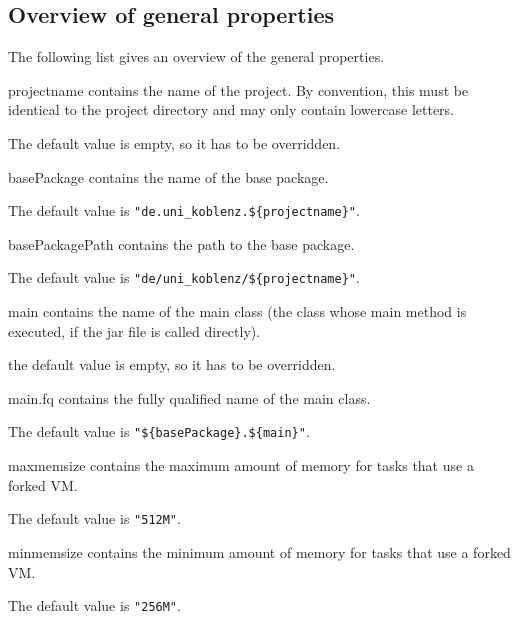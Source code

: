 \documentclass[a4paper,twoside,11pt,bibtotoc]{article}
\begin{document}
\subsection{Overview of general properties}
The following list gives an overview of the general properties.
\begin{description*}
	\item[projectname] contains the name of the project. By convention, this must be identical to the project directory and may only contain lowercase letters.\par The default value is empty, so it has to be overridden.
	\item[basePackage] contains the name of the base package.\par The default value is \texttt{"de.uni\_koblenz.\$\{projectname\}"}.
	\item[basePackagePath] contains the path to the base package.\par The default value is \texttt{"de/uni\_koblenz/\$\{projectname\}"}.
	\item[main] contains the name of the main class (the class whose main method is executed, if the jar file is called directly).\par the default value is empty, so it has to be overridden.
	\item[main.fq] contains the fully qualified name of the main class.\par The default value is \texttt{"\$\{basePackage\}.\$\{main\}"}.
	\item[maxmemsize] contains the maximum amount of memory for tasks that use a forked VM.\par The default value is \texttt{"512M"}.
	\item[minmemsize] contains the minimum amount of memory for tasks that use a forked VM.\par The default value is \texttt{"256M"}.
\end{description*}	
\end{document}
